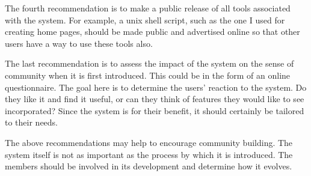 The fourth recommendation is to make a public release of all tools associated
with the system.  For example, a unix shell script, such as the one I used for
creating home pages, should be made public and advertised online so that other
users have a way to use these tools also.

The last recommendation is to assess the impact of the system on the sense of
community when it is first introduced.  This could be in the form of an online
questionnaire.  The goal here is to determine the users' reaction to the
system.  Do they like it and find it useful, or can they think of features they
would like to see incorporated?  Since the system is for their benefit, it
should certainly be tailored to their needs.

The above recommendations may help to encourage community building.  The system
itself is not as important as the process by which it is introduced.  The
members should be involved in its development and determine how it evolves.







